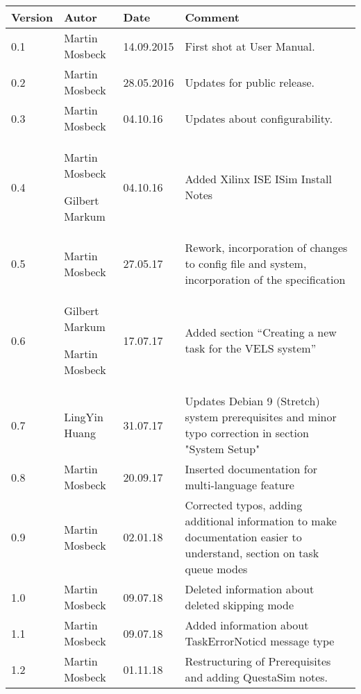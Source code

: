 
\begin{table}[h]
\begin{tabular*}{14.7cm}{|p{}|p{}|p{2cm}|p{}|}
\hline
Version & Autor & Date & Comment \\[2pt]
\hline
\hline
0.1 & Martin Mosbeck & 14.09.2015 & First shot at User Manual. \\[2pt]
\hline
0.2 & Martin Mosbeck & 28.05.2016 & Updates for public release. \\[2pt]
\hline
0.3 & Martin Mosbeck & 04.10.16 & Updates about configurability. \\[2pt]
\hline
0.4 & Martin Mosbeck \par Gilbert Markum & 04.10.16 & Added Xilinx ISE ISim Install Notes \\[2pt]
\hline
0.5 & Martin Mosbeck & 27.05.17 & Rework, incorporation of changes to config file and system, incorporation of the
specification \\[2pt]
\hline
0.6 & Gilbert Markum \par Martin Mosbeck & 17.07.17 & Added section ``Creating a new task for the VELS system'' \\[2pt]
\hline
0.7 & LingYin Huang & 31.07.17 & Updates Debian 9 (Stretch) system prerequisites and minor typo correction in section "System Setup" \\[2pt]
\hline
0.8 & Martin Mosbeck & 20.09.17 & Inserted documentation for multi-language feature \\[2pt]
\hline
0.9 & Martin Mosbeck & 02.01.18 & Corrected typos, adding additional information to make documentation easier to
understand, section on task queue modes  \\[2pt]
\hline
1.0 & Martin Mosbeck & 09.07.18 & Deleted information about deleted skipping mode \\[2pt]
\hline
1.1 & Martin Mosbeck & 09.07.18 & Added information about TaskErrorNoticd message type\\[2pt]
\hline
1.2 & Martin Mosbeck & 01.11.18 & Restructuring of Prerequisites and adding QuestaSim notes.\\[2pt]
\hline
\end{tabular*}
\end{table}

